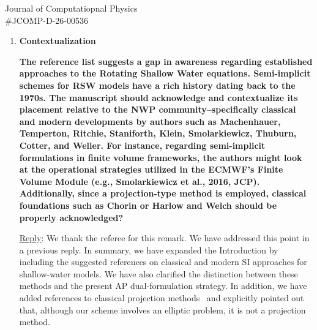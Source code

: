 \documentclass[letter,11pt]{letter}
\begin{document}
\begin{letter}{Journal of Computatiopnal Physics\\\#JCOMP-D-26-00536}
\begin{enumerate}
We emphasize that the coupling between the two formulations is not a discontinuous switch, but a continuous Rossby-dependent blending. In the low-Rossby regime, the method relies predominantly on the primitive AP formulation, which is appropriate because the solutions are smooth and the relevant requirement is the correct recovery of the TQG limit. In high- and intermediate-Rossby regimes, the blending takes into account the conservative formulation, which is essential to retain correct Rankine--Hugoniot shock speeds and robust shock-capturing properties. The additional tests, including those discussed in the previous reply, confirm that the resulting method remains robust across the full range of Rossby numbers considered.

We have added a remark on this at the beginning of Section 4.

Concerning the potential vorticity, we emphasize that this is not a conserved quantity and no conservation is expected for it. Nonetheless, we have quantified the conservation errors of the conserved variables in some tests involving shocks.

{\large \textcolor{magenta}{Nan, for the previous tests (very likely explosion problems at different Rossby), can you measure the loss in conservation of the primitive system (possibly in the mesh refinement)? It should be small if the test is correctly resolved. We can also add a little Table about this.}}


\medskip
\item
{\bf Contextualization}\medskip

{\bf The reference list suggests a gap in awareness regarding established approaches to the Rotating Shallow Water equations. Semi-implicit schemes for RSW models have a rich history dating back to the 1970s. The manuscript should acknowledge and contextualize its placement relative to the NWP community--specifically
classical and modern developments by authors such as Machenhauer, Temperton, Ritchie, Staniforth, Klein, Smolarkiewicz, Thuburn, Cotter, and Weller. For instance, regarding semi-implicit formulations in finite volume frameworks, the authors might look at the operational strategies utilized in the ECMWF’s Finite Volume Module (e.g., Smolarkiewicz et al., 2016, JCP). Additionally, since a projection-type method is employed, classical foundations such as Chorin or Harlow and Welch should be properly acknowledged?}

\medskip
{\sc\underline{Reply}}: We thank the referee for this remark. We have addressed this point in a previous reply. In summary, we have expanded the Introduction by including the suggested references on classical and modern SI approaches for shallow-water models. We have also clarified the distinction between these methods and the present AP dual-formulation strategy. In addition, we have added references to classical projection methods~\cite{chorin1968numerical,harlow1965numerical} and explicitly pointed out that, although our scheme involves an elliptic problem, it is not a projection method.


\end{enumerate}
\end{letter}
\end{document}
